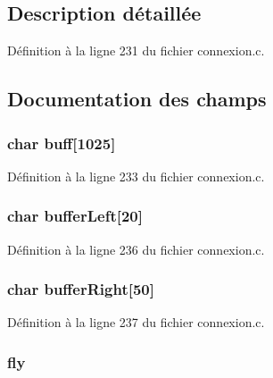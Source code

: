 \subsection{Description détaillée}


Définition à la ligne 231 du fichier connexion.\-c.



\subsection{Documentation des champs}
\hypertarget{structardrone_a825d10649a532df1970c816b4070c690}{
\subsubsection[{buff}]{\setlength{\rightskip}{0pt plus 5cm}char buff\mbox{[}1025\mbox{]}}}\label{structardrone_a825d10649a532df1970c816b4070c690}


Définition à la ligne 233 du fichier connexion.\-c.

\hypertarget{structardrone_a800e0449117874d9d1ff10965cdd346f}{
\subsubsection[{buffer\-Left}]{\setlength{\rightskip}{0pt plus 5cm}char buffer\-Left\mbox{[}20\mbox{]}}}\label{structardrone_a800e0449117874d9d1ff10965cdd346f}


Définition à la ligne 236 du fichier connexion.\-c.

\hypertarget{structardrone_adcadf1aaae5c4a2ab78bed2f4d77346b}{
\subsubsection[{buffer\-Right}]{\setlength{\rightskip}{0pt plus 5cm}char buffer\-Right\mbox{[}50\mbox{]}}}\label{structardrone_adcadf1aaae5c4a2ab78bed2f4d77346b}


Définition à la ligne 237 du fichier connexion.\-c.

\hypertarget{structardrone_a9d1fad21c1121fc07e7f54ae86754cac}{
\subsubsection[{fly}]{ fly}}\label{structardrone_a9d1fad21c1121fc07e7f54ae86754cac}


